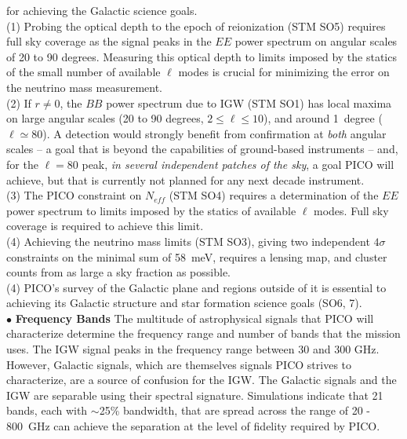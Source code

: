 \documentclass[PICOReport.tex]{subfiles}
\begin{document}
for achieving the Galactic science goals. \\
(1) Probing the optical depth to the epoch of reionization (STM SO5) requires full sky 
coverage as the signal peaks in the $EE$ power spectrum on angular scales of 20 to 90 degrees. Measuring 
this optical depth to limits imposed by the statics of the small number of available $\ell$ modes is crucial 
for minimizing the error on the neutrino mass measurement. \\   
(2) If $r \ne 0 $, the $BB$ power spectrum due to IGW (STM SO1) has local maxima on large angular scales
(20 to 90 degrees, $ 2 \leq \ell \leq 10$), and around 1~degree ($ \ell \simeq 80$). 
A detection would strongly benefit from confirmation at {\it both} angular 
scales -- a goal that is beyond the capabilities of ground-based instruments -- and, for the $\ell = 80$ peak, 
{\it in several independent patches of the sky}, a goal PICO will achieve, but that is currently not planned for 
any next decade instrument.  \\
(3) The PICO constraint on $N_{eff}$ (STM SO4) requires a determination of the $EE$ power spectrum to limits
imposed by the statics of available $\ell$ modes. Full sky coverage is required to achieve this limit.  \\
(4) Achieving the neutrino mass limits (STM SO3), giving two independent $4\sigma$ constraints on the minimal sum of 58~meV, requires
a lensing map, and cluster counts from as large a sky fraction as possible. \\
(4) PICO's survey of the Galactic plane and regions outside of it is essential to achieving its Galactic structure 
and star formation science goals (SO6, 7). \\
%
$\bullet$ {\bf Frequency Bands} \hspace{0.1in} The multitude of astrophysical signals that PICO will characterize 
determine the frequency range and number of bands that the mission uses. The \ac{IGW} signal peaks 
in the frequency range between 30 and 300 GHz. However, Galactic signals, which are themselves signals PICO strives to 
characterize, are a source of confusion for the IGW. The Galactic signals and the IGW are separable using their 
spectral signature. Simulations indicate that 21 bands, each with $\sim$25\% bandwidth, that are spread across 
the range of 20 - 800~GHz can achieve the separation at the level of fidelity required by PICO. 
\end{document}

